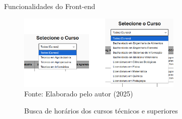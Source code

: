\begin{frame}{Funcionalidades do Front-end}
    \begin{figure}
        \centering
        \vspace{-0.5cm}
        \caption{Busca de horários dos cursos técnicos e superiores}
        \vspace{-0.2cm}
        \includegraphics[width=0.7\textwidth]{figuras/front-17.png}
        \\ %
        \small Fonte: Elaborado pelo autor (2025)
    \end{figure}
\end{frame}

